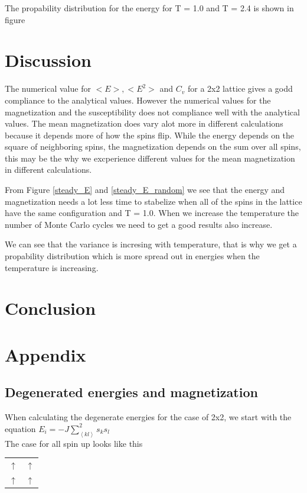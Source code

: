 \documentclass{article}
\begin{document}
{The propability distribution for the energy for T = 1.0 and T = 2.4 is shown in figure

\section{Discussion}


The numerical value for $<E>, <E^2>$ and $C_v$ for a 2x2 lattice gives a godd compliance to the analytical values. However the numerical values for the magnetization and the susceptibility does not compliance well with the analytical values. The mean magnetization does vary alot more in different calculations because it depends more of how the spins flip. While the energy depends on the square of neighboring spins, the magnetization depends on the sum over all spins, this may be the why we excperience different values for the mean magnetization in different calculations.

From Figure \ref{steady_E} and \ref{steady_E_random} we see that the energy and magnetization needs a lot less time to stabelize when all of the spins in the lattice have the same configuration and T = 1.0. When we increase the temperature the number of Monte Carlo cycles we need to get a good results also increase.  


We can see that the variance is incresing with temperature, that is why we get a propability distribution which is more spread out in energies when the temperature is increasing.

\section{Conclusion}


\section{Appendix}
\subsection{Degenerated energies and magnetization}

When calculating the degenerate energies for the case of 2x2, we start with the equation $E_i=-J\sum\limits_{\left<kl\right>}^{2}s_ks_l$\\
The case for all spin up looks like this
\begin{tabular}{c c}
  $\uparrow$ & $\uparrow$\\
  $\uparrow$ & $\uparrow$
\end{tabular}\\

}
\end{document}

